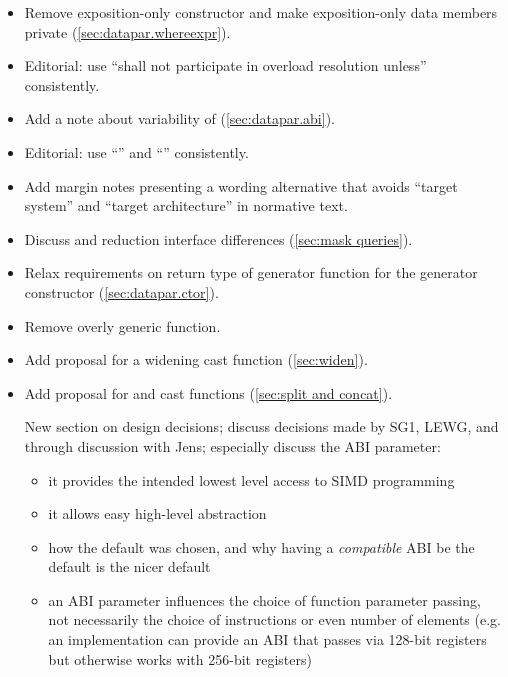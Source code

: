 \begin{itemize}
  \item Remove exposition-only  constructor and make exposition-only data members private (\ref{sec:datapar.whereexpr}).
  \item Editorial: use “shall not participate in overload resolution unless” consistently.
  \item Add a note about variability of  (\ref{sec:datapar.abi}).
  \item Editorial: use “\targetArch{}” and “\currentTarget{}” consistently.
  \item Add margin notes presenting a wording alternative that avoids “target system” and “target architecture” in normative text.
  \item Discuss \mask and  reduction interface differences (\ref{sec:mask queries}).
  \item Relax requirements on return type of generator function for the generator constructor (\ref{sec:datapar.ctor}).
  \item Remove overly generic  function.
  \item Add proposal for a widening cast function (\ref{sec:widen}).
  \item Add proposal for  and  cast functions (\ref{sec:split and concat}).

  \todo New section on design decisions; discuss decisions made by SG1, LEWG, and through discussion with Jens; especially discuss the ABI parameter:
  \begin{itemize}
    \item it provides the intended lowest level access to SIMD programming
    \item it allows easy high-level abstraction
    \item how the default was chosen, and why having a \emph{compatible} ABI be the default is the nicer default
    \item an ABI parameter influences the choice of function parameter passing, not necessarily the choice of instructions or even number of elements (e.g. an implementation can provide an ABI that passes via 128-bit registers but otherwise works with 256-bit registers)
  \end{itemize}
\end{itemize}










